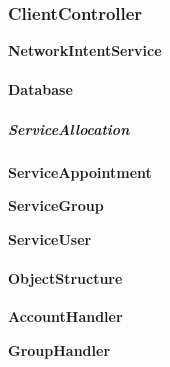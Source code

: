 \subsubsection{ClientController}

\textbf{NetworkIntentService}

\paragraph{Database}

\subparagraph{ServiceAllocation}

\begin{figure}[H]
	
	\centering
\end{figure}




\textbf{ServiceAppointment}

\textbf{ServiceGroup}

\textbf{ServiceUser}

\paragraph{ObjectStructure}

\textbf{AccountHandler}

\textbf{GroupHandler}
